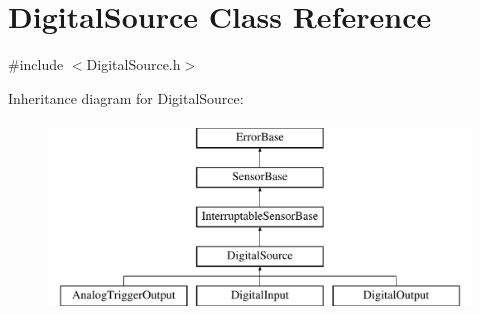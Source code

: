 \hypertarget{classDigitalSource}{\section{\-Digital\-Source \-Class \-Reference}
\label{classDigitalSource}
}


{\ttfamily \#include $<$\-Digital\-Source.\-h$>$}

\-Inheritance diagram for \-Digital\-Source\-:\begin{figure}[H]
\begin{center}
\leavevmode
\includegraphics[height=5.000000cm]{classDigitalSource}
\end{center}
\end{figure}
